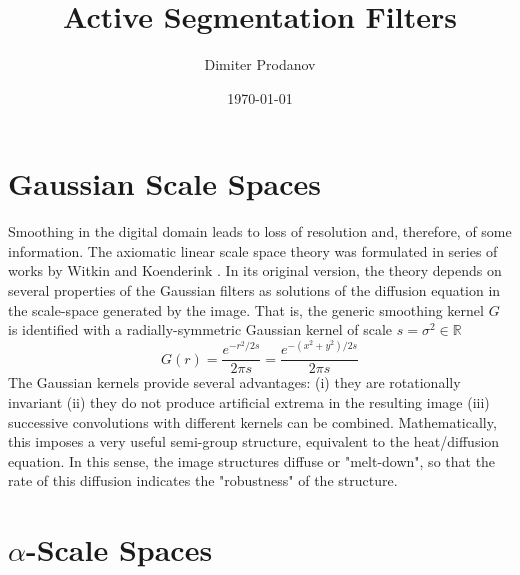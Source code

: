 \documentclass{amsart}
\title{Active Segmentation Filters}
\author{Dimiter Prodanov  }
\begin{document}
\date{\today}	
\maketitle
\tableofcontents


\section{Gaussian Scale Spaces}

Smoothing in the digital domain leads to loss of resolution and, therefore, of some information.
The axiomatic linear scale space theory was formulated in series of works by Witkin and Koenderink \cite{Witkin1983, Koenderink1984}.
In its original version, the theory depends on several properties of the Gaussian filters as solutions of the diffusion equation in the scale-space generated by the image.
That is, the generic smoothing kernel $G$ is identified with a radially-symmetric Gaussian kernel of scale $s=\sigma^2 \in \mathbb{R}$
\[
G (r)= \frac{e^{-r^2/2s}}{2 \pi s } = \frac{e^{-(x^2+y^2)/2s}}{2 \pi s }
\]
The Gaussian kernels provide several advantages:  
(i) they are rotationally invariant
(ii) they do not produce artificial extrema in the resulting image
(iii) successive convolutions with different kernels can be combined.
Mathematically, this imposes a very useful semi-group structure, equivalent to the heat/diffusion equation.
In this sense, the image structures diffuse or "melt-down", so that the rate of this diffusion indicates the "robustness" of the structure.

\section{$\alpha$-Scale Spaces}\label{sec:alphascale}
\end{document}
